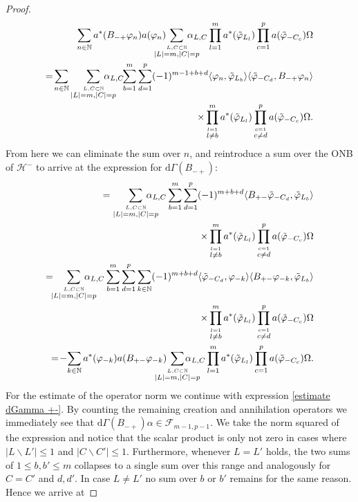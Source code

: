\documentclass[b5paper,draft,openbib,12pt]{memoir}
\begin{document}
\begin{proof}
\begin{align}\nonumber
\sum_{n\in\mathbb{N}} a^*(B_{-+}\varphi_n)a(\varphi_{n})\hspace{-0.5cm}\sum_{\overset{L,C\subset \mathbb{N}}{|L|=m,|C|=p}}  \hspace{-0.5cm}\alpha_{L,C} 
\prod_{l=1}^m a^*(\tilde{\varphi}_{L_l}) \prod_{c=1}^p a(\tilde{\varphi}_{-C_c}) \Omega  \\\nonumber
=\!\sum_{n\in\mathbb{N}}\sum_{\overset{L,C\subset \mathbb{N}}{|L|=m,|C|=p}}\hspace{-0.5cm}\alpha_{L,C}\!\!\sum_{b=1}^m\sum_{d=1}^p(-1)^{m-1+b+d}\langle \varphi_n, \tilde{\varphi}_{L_b}\rangle \langle \tilde{\varphi}_{-C_d},B_{-+}\varphi_n\rangle\\
\times \prod_{\overset{l=1}{l\neq b}}^m a^*(\tilde{\varphi}_{L_l})
\prod_{\overset{c=1}{c\neq d}}^p a(\tilde{\varphi}_{-C_c})\Omega.
\end{align}
From here we can eliminate the sum over \(n\), and reintroduce a sum 
over the ONB of \(\mathcal{H}^-\) to arrive at the 
expression for \(\mathrm{d}\Gamma(B_{-+})\):
\begin{align}
=\sum_{\overset{L,C\subset \mathbb{N}}{|L|=m,|C|=p}}\hspace{-0.5cm} \alpha_{L,C} \sum_{b=1}^m \sum_{d=1}^p (-1)^{m+b+d} \langle B_{+-} \tilde{\varphi}_{-C_d},\tilde{\varphi}_{L_b}\rangle \notag\\
\times\prod_{\overset{l=1}{l\neq b}}^m a^*(\tilde{\varphi}_{L_l})
\prod_{\overset{c=1}{c\neq d}}^p a(\tilde{\varphi}_{-C_c})\Omega\label{estimate dGamma +-}\\
=\!\!\!\sum_{\overset{L,C\subset \mathbb{N}}{|L|=m,|C|=p}}\hspace{-0.5cm} \alpha_{L,C} \sum_{b=1}^m \sum_{d=1}^p \sum_{k\in\mathbb{N}}(-1)^{m+b+d} \langle \tilde{\varphi}_{-C_d},\varphi_{-k}\rangle \langle B_{+-}\varphi_{-k},\tilde{\varphi}_{L_b}\rangle \notag\\
\times\prod_{\overset{l=1}{l\neq b}}^m a^*(\tilde{\varphi}_{L_l})
\prod_{\overset{c=1}{c\neq d}}^p a(\tilde{\varphi}_{-C_c})\Omega\\
=\!-\!\sum_{k\in\mathbb{N}}a^*(\varphi_{-k})a(B_{+-}\varphi_{-k})\hspace{-0.5cm}\sum_{\overset{L,C\subset \mathbb{N}}{|L|=m,|C|=p}}\hspace{-0.6cm}\alpha_{L,C}\prod_{l=1}^m a^*(\tilde{\varphi}_{L_l})\prod_{c=1}^pa(\tilde{\varphi}_{-C_c})\Omega.
\end{align}
For the estimate of the operator norm we continue with expression 
\eqref{estimate dGamma +-}.
By counting the remaining creation and annihilation operators 
we immediately see that \(\mathrm{d}\Gamma(B_{-+})\alpha\in 
\mathcal{F}_{m-1,p-1}\). We take the norm squared of the 
expression and notice that the scalar product is only 
not zero in cases where \(|L\backslash L'|\le 1\) and 
\(|C\backslash C'|\le 1\). Furthermore, whenever 
\(L = L'\) holds, the two sums of \(1\le b,b'\le m\)
collapses to a single sum over this range and analogously
for \(C = C'\) and \(d,d'\). In case \(L \neq L'\)
no sum over \(b\) or \(b'\) remains for the same reason.
Hence we arrive at



\end{proof}
\end{document}
